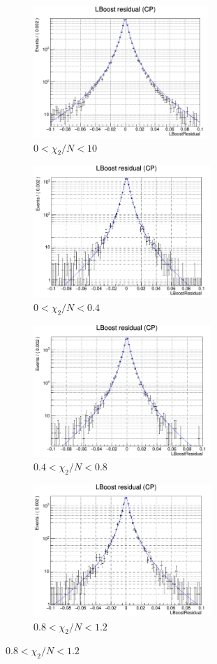 \begin{figure}[htbp]
	\begin{subfigure}{0.5\linewidth}
		\caption{$0<\chi_2/N<10$}
		\includegraphics[height=5cm]{figures/residual0_10}
		
	\end{subfigure}
	\begin{subfigure}{0.5\linewidth}
		\caption{$0<\chi_2/N<0.4$}
		\includegraphics[height=5cm]{figures/residual0_0.4}
	\end{subfigure}
	
	
	\begin{subfigure}{0.5\linewidth}
		\caption{$0.4<\chi_2/N<0.8$}
		\includegraphics[height=5cm]{figures/residual0.4_0.8}
	\end{subfigure}
	\begin{subfigure}{0.5\linewidth}
		\caption{$0.8<\chi_2/N<1.2$}
		\includegraphics[height=5cm]{figures/residual0.8_1.2}
	\end{subfigure}
	

\end{figure}
